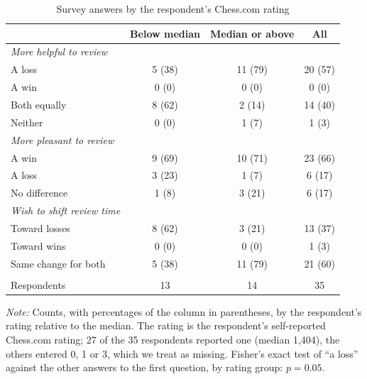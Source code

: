 \begin{table}[tbp]\centering
  \begin{threeparttable}
    \caption{Survey answers by the respondent's Chess.com rating}
    \label{tab:survey_by_rating}
    \begin{tabular}{lccc}
      \toprule
       & \multicolumn{1}{c}{Below median} & \multicolumn{1}{c}{Median or above} & \multicolumn{1}{c}{All}\\
      \midrule
      \textit{More helpful to review} & & & \\
      \quad A loss & 5 (38) & 11 (79) & 20 (57)\\
      \quad A win & 0 (0) & 0 (0) & 0 (0)\\
      \quad Both equally & 8 (62) & 2 (14) & 14 (40)\\
      \quad Neither & 0 (0) & 1 (7) & 1 (3)\\
      \textit{More pleasant to review} & & & \\
      \quad A win & 9 (69) & 10 (71) & 23 (66)\\
      \quad A loss & 3 (23) & 1 (7) & 6 (17)\\
      \quad No difference & 1 (8) & 3 (21) & 6 (17)\\
      \textit{Wish to shift review time} & & & \\
      \quad Toward losses & 8 (62) & 3 (21) & 13 (37)\\
      \quad Toward wins & 0 (0) & 0 (0) & 1 (3)\\
      \quad Same change for both & 5 (38) & 11 (79) & 21 (60)\\
       \\
      Respondents & 13 & 14 & 35\\
      \bottomrule
    \end{tabular}
    \begin{tablenotes}
      \footnotesize
      \item \textit{Note:} Counts, with percentages of the column in parentheses, by the respondent's rating relative to the median. The rating is the respondent's self-reported Chess.com rating; 27 of the 35 respondents reported one (median 1,404), the others entered 0, 1 or 3, which we treat as missing. Fisher's exact test of ``a loss'' against the other answers to the first question, by rating group: $p=0.05$.
    \end{tablenotes}
  \end{threeparttable}
\end{table}
